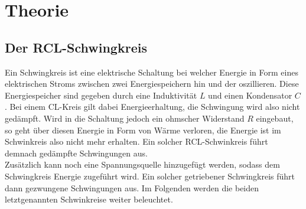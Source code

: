 \section{Theorie}
\label{sec:Theorie}
\subsection{Der RCL-Schwingkreis}
\label{sec:RCL}
Ein Schwingkreis ist eine elektrische Schaltung bei welcher Energie in Form eines elektrischen Stroms zwischen zwei Energiespeichern hin 
und der oszillieren. Diese Energiespeicher sind gegeben durch eine Induktivität $L$ und einen Kondensator $C$. Bei einem CL-Kreis gilt dabei
Energieerhaltung, die Schwingung wird also nicht gedämpft. Wird in die Schaltung jedoch ein ohmscher Widerstand $R$ eingebaut, so geht über 
diesen Energie in Form von Wärme verloren, die Energie ist im Schwinkreis also nicht mehr erhalten. Ein solcher RCL-Schwinkreis führt demnach
gedämpfte Schwingungen aus.\\\noindent
Zusätzlich kann noch eine Spannungsquelle hinzugefügt werden, sodass dem Schwingkreis Energie zugeführt wird. Ein solcher getriebener 
Schwingkreis führt dann gezwungene Schwingungen aus.
Im Folgenden werden die beiden letztgenannten Schwinkreise weiter beleuchtet.

